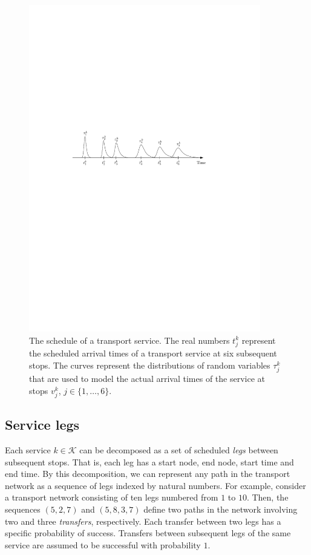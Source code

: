 \documentclass[dissertation,draft*]{aaltoseries}
\begin{document}
\begin{figure}[ht]
\begin{center}
\includegraphics[width=0.9\textwidth]{stokvsdet02}
\end{center}
\caption{The schedule of a transport service. The real numbers $t_j^k$ represent the scheduled arrival
times of a transport service at six subsequent stops. The curves  
represent the distributions of random variables $\tau_j^k$ that are used to model the actual arrival 
times of the service at stops $v_j^k$, $j \in \{1,\ldots,6\}$.}
\label{stokvsdet02}
\end{figure}

\subsection{Service legs}
Each service $k \in \mathcal{K}$ can be decomposed as a set of scheduled \emph{legs} between subsequent stops.
That is, each leg has a start node, end node, start time and end time.
By this decomposition, we can represent any path in the transport network as a sequence 
of legs indexed by natural numbers. For example, consider a transport network consisting of ten legs
numbered from $1$ to $10$. Then, the sequences $(5,2,7)$ and $(5,8,3,7)$ define two paths in the network 
involving two and three \emph{transfers}, respectively. Each transfer between two legs has a specific probability of success.
Transfers between subsequent legs of the same service are assumed to be successful with 
probability $1$.
\end{document}
